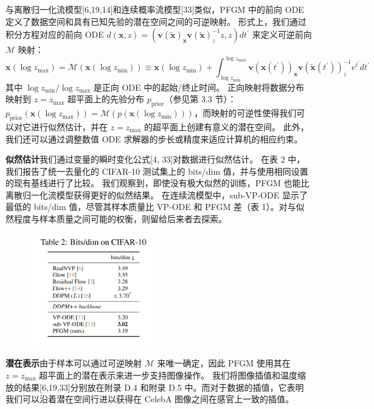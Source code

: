 \documentclass[hyperref,UTF-8]{ctexart}
\newcommand{\0}{\boldsymbol{0}}
\begin{document}
与离散归一化流模型[6,19,14]和连续概率流模型[33]类似，PFGM 中的前向 ODE 定义了数据空间和具有已知先验的潜在空间之间的可逆映射。 形式上，我们通过积分方程对应的前向 ODE $d(\mathbf{x}, z)=\left(\mathbf{v}(\tilde{\mathbf{x}})_{\mathbf{x}} \mathbf{v}(\tilde{\mathbf{x}})_z^{-1} z, z\right) d t^{\prime}$ 来定义可逆前向 $\mathcal{M}$ 映射：
\[
  \mathbf{x}\left(\log z_{\max }\right)=\mathcal{M}\left(\mathbf{x}\left(\log z_{\min }\right)\right) \equiv \mathbf{x}\left(\log z_{\min }\right)+\int_{\log z_{\min }}^{\log z_{\max }} \mathbf{v}\left(\mathbf{x}\left(t^{\prime}\right)\right)_{\mathbf{x}} \mathbf{v}\left(\tilde{\mathbf{x}}\left(t^{\prime}\right)\right)_z^{-1} e^{t^{\prime}} d t^{\prime}
\]
其中 $\log z_{\min} / \log z_{\max}$ 是正向 ODE 中的起始/终止时间。 正向映射将数据分布映射到 $z = z_{\max}$ 超平面上的先验分布 $p_\text{prior}$（参见第 3.3 节）：$p_{\text {prior}}\left(\mathbf{x}\left(\log z_{\max}\right)\right)=\mathcal{M}\left(p\left(\mathbf{x}\left(\log z_{\min}\right)\right)\right)$，而映射的可逆性使得我们可以对它进行似然估计，并在 $z = z_{\max}$ 的超平面上创建有意义的潜在空间。 此外，我们还可以通过调整数值 ODE 求解器的步长或精度来适应计算机的相应约束。

\textbf{似然估计}\quad 我们通过变量的瞬时变化公式[4, 33]对数据进行似然估计。 在表 2 中，我们报告了统一去量化的 CIFAR-10 测试集上的 bits/dim 值，并与使用相同设置的现有基线进行了比较。 我们观察到，即使没有极大似然的训练，PFGM 也能比离散归一化流模型获得更好的似然结果。 在连续流模型中，sub-VP-ODE 显示了最低的 bits/dim 值，尽管其样本质量比 VP-ODE 和 PFGM 差（表 1）。对与似然程度与样本质量之间可能的权衡，则留给后来者去探索。

\begin{figure}[ht]
  \centering
  \includegraphics[width=0.5\textwidth]{img/table2.png}
\end{figure}

\textbf{潜在表示}\quad 由于样本可以通过可逆映射 $\mathcal M$ 来唯一确定，因此 PFGM 使用其在 $z = z_{\max}$ 超平面上的潜在表示来进一步支持图像操作。 我们将图像插值和温度缩放的结果[6,19,33]分别放在附录 D.4 和附录 D.5 中。而对于数据的插值，它表明我们可以沿着潜在空间行进以获得在 CelebA 图像之间在感官上一致的插值。
\end{document}
